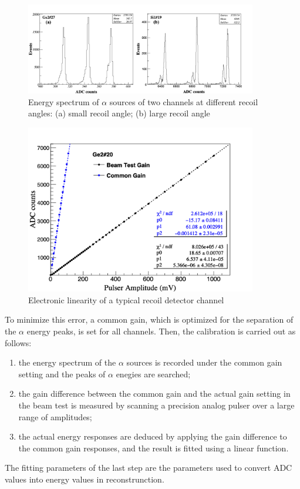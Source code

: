 \documentclass[number]{elsarticle}
\begin{document}
\begin{figure}[htbp]
\centering
\includegraphics[width=0.9\textwidth]{./alpha_response.png}
\caption{Energy spectrum of \(\alpha\) sources of two channels at different recoil angles: (a) small recoil angle; (b) large recoil angle}
\label{fig:alpha_spectrum}
\end{figure}

\begin{figure}[htbp]
\centering
\includegraphics[width=0.9\textwidth]{./linearity.png}
\caption{Electronic linearity of a typical recoil detector channel}
\label{fig:electronic_linearity}
\end{figure}

To minimize this error, a common gain, which is optimized for the separation of the \(\alpha\) energy peaks, is set for all channels.
Then, the calibration is carried out as follows:
\begin{enumerate}
\item the energy spectrum of the \(\alpha\) sources is recorded under the common gain setting and the peaks of \(\alpha\) enegies are searched;
\item the gain difference between the common gain and the actual gain setting in the beam test is measured by scanning a precision analog pulser over a large range of amplitudes;
\item the actual energy responses are deduced by applying the gain difference to the common gain responses, and the result is fitted using a linear function.
\end{enumerate}
The fitting parameters of the last step are the parameters used to convert ADC values into energy values in reconstrunction.
\end{document}
